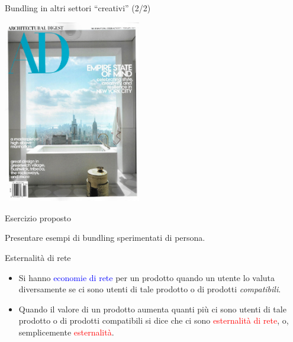 \documentclass{beamer}
\begin{document}
\begin{frame}
{\centerline{Bundling in altri settori ``creativi'' (2/2)}}
\begin{center}
    \includegraphics[width=0.45\textwidth]{A2023.IDSEPC.ConcettoDiSoftware/BundlingAD.pdf}
\end{center}

\end{frame}

\begin{frame}
{\centerline{Esercizio proposto}}
\vspace{1cm}
\begin{center}
    \LARGE{Presentare esempi di bundling sperimentati di persona.}
\end{center}

\end{frame}



\begin{frame}
{\centerline{Esternalit\`{a} di rete}}

\begin{itemize}
\item Si hanno \textcolor{blue}{economie di rete} per un prodotto quando un utente lo valuta  diversamente se ci sono utenti di tale prodotto o di prodotti \textit{compatibili}.

\item Quando il valore di un prodotto aumenta quanti pi\`{u} ci sono utenti di tale prodotto o di prodotti compatibili si dice che ci sono \textcolor{red}{esternalit\`{a} di rete}, o, semplicemente \textcolor{red}{esternalit\`{a}}.


\end{itemize}

\end{frame}
\end{document}
